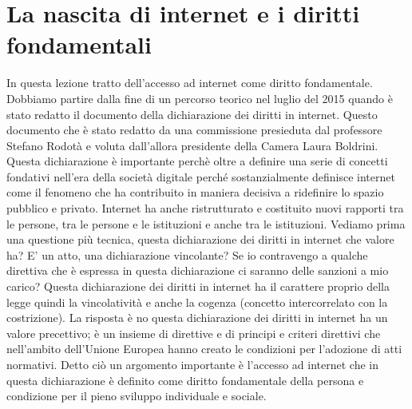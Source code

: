 \section{La nascita di internet e i diritti fondamentali}
In questa lezione tratto dell'accesso ad internet come diritto fondamentale. 
Dobbiamo partire dalla fine di un percorso teorico nel luglio del 2015 quando è stato redatto il documento della dichiarazione dei diritti in internet. Questo documento che è stato redatto da una commissione presieduta dal professore Stefano Rodotà e voluta dall'allora presidente della Camera Laura Boldrini.
Questa dichiarazione è importante perchè oltre a definire una serie di concetti fondativi nell'era della società digitale perché sostanzialmente definisce internet come il fenomeno che ha contribuito in maniera decisiva a ridefinire lo spazio pubblico e privato.
Internet ha anche ristrutturato e costituito nuovi rapporti tra le persone, tra le persone e le istituzioni e anche tra le istituzioni.
Vediamo prima una questione più tecnica, questa dichiarazione dei diritti in internet che valore ha?
E' un atto, una dichiarazione vincolante? Se io contravengo a qualche direttiva che è espressa in questa dichiarazione ci saranno delle sanzioni a mio carico? Questa dichiarazione dei diritti in internet ha il carattere proprio della legge quindi la vincolatività e anche la cogenza (concetto intercorrelato con la costrizione).
La risposta è no questa dichiarazione dei diritti in internet ha un valore precettivo; è un insieme di direttive e di principi e criteri direttivi che nell'ambito dell'Unione Europea hanno creato le condizioni per l'adozione di atti normativi. 
Detto ciò un argomento importante è l'accesso ad internet che in questa dichiarazione è definito come diritto fondamentale della persona e condizione per il pieno sviluppo individuale e sociale.

